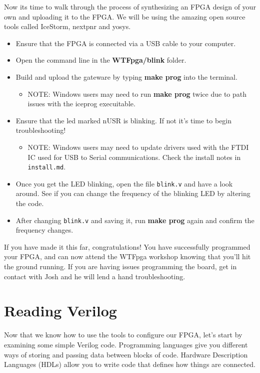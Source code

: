 \documentclass[12pt,a4paper]{article}
\begin{document}
\noindent
Now its time to walk through the process of synthesizing an FPGA design of your own and uploading it to the FPGA. We will be using the amazing open source tools called IceStorm, nextpnr and yosys. 
\begin{itemize}
		\item Ensure that the FPGA is connected via a USB cable to your computer. 
		\item Open the command line in the \textbf{WTFpga/blink} folder.
		\item Build and upload the gateware by typing \textbf{make prog} into the terminal. 
			\begin{itemize}
				\item NOTE: Windows users may need to run \textbf{make prog} twice due to path issues with the iceprog execuitable. 
			\end{itemize}
		\item Ensure that the led marked nUSR is blinking. If not it's time to begin troubleshooting!
			\begin{itemize}
				\item NOTE: Windows users may need to update drivers used with the FTDI IC used for USB to Serial communications. Check the install notes in \texttt{install.md}.
			\end{itemize}
		\item Once you get the LED blinking, open the file \texttt{blink.v} and have a look around. See if you can change the frequency of the blinking LED by altering the code. 
		\item After changing \texttt{blink.v} and saving it, run \textbf{make prog} again and confirm the frequency changes. 
\end{itemize}
If you have made it this far, congratulations! You have successfully programmed your FPGA, and can now attend the WTFpga workshop knowing that you'll hit the ground running. If you are having issues programming the board, get in contact with Josh and he will lend a hand troubleshooting. 
\newpage
\section{Reading Verilog}
Now that we know how to use the tools to configure our FPGA, let’s start by examining some simple Verilog code. Programming languages give you different ways of storing and passing data between blocks of code. Hardware Description Languages (HDLs) allow you to write code that defines how things are connected. 
\end{document}
